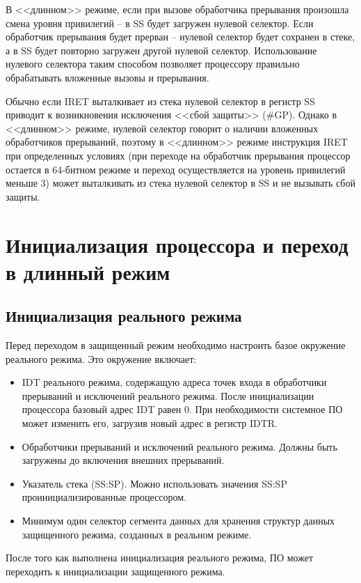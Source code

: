 В <<длинном>> режиме, если при вызове обработчика прерывания произошла смена
уровня привилегий -- в SS будет загружен нулевой селектор. Если обработчик
прерывания будет прерван -- нулевой селектор будет сохранен в стеке, а в SS
будет повторно загружен другой нулевой селектор. Использование нулевого
селектора таким способом позволяет процессору правильно обрабатывать вложенные
вызовы и прерывания.

Обычно если IRET выталкивает из стека нулевой селектор в регистр SS приводит к
возникновения исключения <<сбой защиты>> (\#GP). Однако в <<длинном>> режиме,
нулевой селектор говорит о наличии вложенных обработчиков прерываний, поэтому
в <<длинном>> режиме инструкция IRET при определенных условиях (при переходе
на обработчик прерывания процессор остается в 64-битном режиме и переход
осуществляется на уровень привилегий меньше 3) может
выталкивать из стека нулевой селектор в SS и не вызывать сбой защиты.

\section{Инициализация процессора и переход в длинный режим}
\label{sec:long_mode_activation}

\subsection{Инициализация реального режима}
Перед переходом в защищенный режим необходимо настроить базое окружение
реального режима. Это окружение включает:
\begin{itemize}
\item IDT реального режима, содержащую адреса точек входа в обработчики прерываний
	и исключений реального режима. После инициализации процессора базовый адрес IDT
	равен 0. При необходимости системное ПО может изменить его, загрузив новый адрес
	в регистр IDTR.
\item Обработчики прерываний и исключений реального режима. Должны быть загружены до
	включения внешних прерываний.
\item Указатель стека (SS:SP). Можно использовать значения SS:SP проинициализированные процессором.
\item Минимум один селектор сегмента данных для хранения структур данных защищенного режима,
	созданных в реальном режиме.
\end{itemize}

После того как выполнена инициализация реального режима, ПО может переходить к
инициализации защищенного режима.

